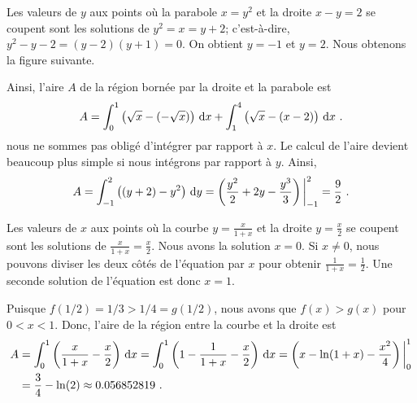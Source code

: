 { Les valeurs de $y$ aux points où la parabole
$\displaystyle x=y^2$ et la droite $\displaystyle x-y=2$ se
coupent sont les solutions de $y^2 = x = y+2$;
c'est-à-dire, $y^2 -y - 2 = (y-2)(y+1) = 0$.  On obtient
$y = -1$ et $y = 2$.  Nous obtenons la figure suivante.

Ainsi, l'aire $A$ de la région bornée par la droite et la parabole est
\[
A = \int_0^1 \left( \sqrt{x} - (- \sqrt{x})\right) \,\mathrm{d}x +
\int_1^4 \left( \sqrt{x} - (x-2)\right) \,\mathrm{d}x \ .
\]
nous ne sommes pas obligé d'intégrer par rapport à $x$.  Le calcul de l'aire
devient beaucoup plus simple si nous intégrons par rapport à $y$.  Ainsi,
\[
A = \int_{-1}^2 \left( (y+2) - y^2 \right) \,\mathrm{d}y
= \left( \frac{y^2}{2} + 2 y - \frac{y^3}{3} \right)\bigg|_{-1}^2
= \frac{9}{2} \ .
\]

 Les valeurs de $x$ aux points où la courbe
$\displaystyle y=\frac{x}{1+x}$ et la droite $\displaystyle y=\frac{x}{2}$ se
coupent sont les solutions de 
$\displaystyle \frac{x}{1+x} = \frac{x}{2}$.  Nous avons la solution $x=0$.
Si $x\neq 0$, nous pouvons diviser les deux côtés de l'équation par $x$ pour
obtenir $\displaystyle \frac{1}{1+x} = \frac{1}{2}$.  Une seconde
solution de l'équation est donc $x=1$.

Puisque $f(1/2) = 1/3 > 1/4 = g(1/2)$, nous avons que $f(x)>g(x)$ pour $0<x<1$.
Donc, l'aire de la région entre la courbe et la droite est
\begin{align*}
A &= \int_0^1 \left( \frac{x}{1+x} - \frac{x}{2} \right) \,\mathrm{d}x
= \int_0^1 \left( 1 - \frac{1}{1+x} - \frac{x}{2} \right) \,\mathrm{d}x
= \left( x - \ln(1+x) - \frac{x^2}{4} \right)\bigg|_0^1 \\
&= \frac{3}{4} - \ln(2) \approx 0.056852819  \ .
\end{align*}
}

